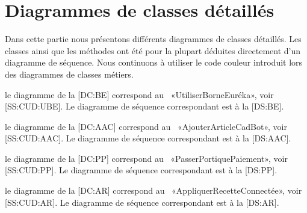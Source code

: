 \chapter[CH:CT]{Diagrammes de classes détaillés}

Dans cette partie nous présentons différents diagrammes de classes détaillés.
Les classes ainsi que les méthodes ont été pour la plupart déduites directement d'un diagramme de séquence.
Nous continuons à utiliser le code couleur introduit lors des diagrammes de classes métiers.

\startitemize
\item le diagramme de la [DC:BE] correspond au \cu\ «UtiliserBorneEuréka», voir [SS:CUD:UBE].
Le diagramme de séquence correspondant est à la [DS:BE].

\item le diagramme de la [DC:AAC] correspond au \cu\ «AjouterArticleCadBot», voir [SS:CUD:AAC].
Le diagramme de séquence correspondant est à la [DS:AAC].

\item le diagramme de la [DC:PP] correspond au \cu\ «PasserPortiquePaiement», voir [SS:CUD:PP].
Le diagramme de séquence correspondant est à la [DS:PP].

\item le diagramme de la [DC:AR] correspond au \cu\ «AppliquerRecetteConnectée», voir [SS:CUD:AR].
Le diagramme de séquence correspondant est à la [DS:AR].

\stopitemize

{}

{}

{}

{}


